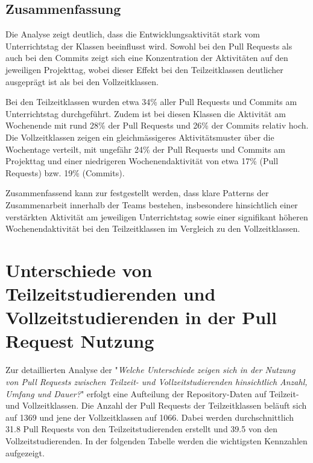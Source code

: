 \subsection{Zusammenfassung}
Die Analyse zeigt deutlich, dass die Entwicklungsaktivität stark vom Unterrichtstag der Klassen beeinflusst wird. Sowohl bei den Pull Requests als auch bei den Commits zeigt sich eine Konzentration der Aktivitäten auf den jeweiligen Projekttag, wobei dieser Effekt bei den Teilzeitklassen deutlicher ausgeprägt ist als bei den Vollzeitklassen.

Bei den Teilzeitklassen wurden etwa 34\% aller Pull Requests und Commits am Unterrichtstag durchgeführt. Zudem ist bei diesen Klassen die Aktivität am Wochenende mit rund 28\% der Pull Requests und 26\% der Commits relativ hoch. Die Vollzeitklassen zeigen ein gleichmässigeres Aktivitätsmuster über die Wochentage verteilt, mit ungefähr 24\% der Pull Requests und Commits am Projekttag und einer niedrigeren Wochenendaktivität von etwa 17\% (Pull Requests) bzw. 19\% (Commits).

Zusammenfassend kann zur  festgestellt werden, dass klare Patterns der Zusammenarbeit innerhalb der Teams bestehen, insbesondere hinsichtlich einer verstärkten Aktivität am jeweiligen Unterrichtstag sowie einer signifikant höheren Wochenendaktivität bei den Teilzeitklassen im Vergleich zu den Vollzeitklassen.
\section{Unterschiede von Teilzeitstudierenden und Vollzeitstudierenden in der Pull Request Nutzung}
Zur detaillierten Analyse der  "\textit{Welche Unterschiede zeigen sich in der Nutzung von Pull Requests zwischen Teilzeit- und Vollzeitstudierenden hinsichtlich Anzahl, Umfang und Dauer?}" erfolgt eine Aufteilung der Repository-Daten auf Teilzeit- und Vollzeitklassen. Die Anzahl der Pull Requests der Teilzeitklassen beläuft sich auf 1369 und jene der Vollzeitklassen auf 1066. Dabei werden durchschnittlich 31.8 Pull Requests von den Teilzeitstudierenden erstellt und 39.5 von den Vollzeitstudierenden. In der folgenden Tabelle werden die wichtigsten Kennzahlen aufgezeigt.

